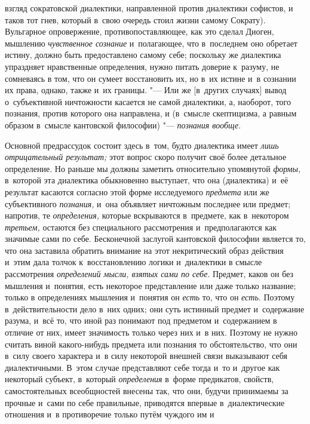 взгляд сократовской диалектики, направленной против диалектики софистов, и
таков тот гнев, который в~свою очередь стоил жизни самому Сократу).
Вульгарное опровержение, противопоставляющее, как это сделал Диоген,
мышлению {\em чувственное сознание}
и~полагающее, что в~последнем оно обретает истину, должно
быть предоставлено самому себе; поскольку же диалектика упраздняет
нравственные определения, нужно питать доверие к~разуму, не сомневаясь в
том, что он сумеет восстановить их, но в~их истине и~в сознании их права,
однако, также и~их границы. "--- Или же [в~других случаях]
вывод о~субъективной ничтожности касается не самой диалектики, а, наоборот,
того познания, против которого она направлена, и (в~смысле скептицизма, а
равным образом в~смысле кантовской философии) "--- {\em познания вообще}.

Основной предрассудок состоит здесь в~том, будто диалектика
имеет {\em лишь отрицательный
результат;} этот вопрос скоро получит своё более детальное
определение. Но раньше мы должны заметить относительно упомянутой
{\em формы,} в~которой
эта диалектика обыкновенно выступает, что она (диалектика) и~её результат
касаются согласно этой форме исследуемого {\em предмета} или же
субъективного {\em познания,} и~она объявляет ничтожным последнее или
предмет; напротив, те {\em определения,}
которые вскрываются в~предмете, как в~некотором {\em третьем,} остаются
без специального рассмотрения и~предполагаются как значимые сами по себе.
\label{bkm:bm126a}Бесконечной заслугой кантовской философии
является то, что она заставила обратить внимание на этот некритический
образ действия и~этим дала толчок к~восстановлению логики и~диалектики в
смысле рассмотрения {\em определений
мысли, взятых сами по себе}. Предмет, каков он без мышления
и~понятия, есть некоторое представление или даже только название; только в
определениях мышления и~понятия он {\em есть} то, что он {\em есть}. Поэтому
в~действительности дело в~них одних; они суть истинный предмет и~содержание
разума, и~всё то, что иной раз понимают под предметом и~содержанием в
отличие от них, имеет значимость только через них и~в них. Поэтому не нужно
считать виной какого-нибудь предмета или познания то обстоятельство, что
они в~силу своего характера и~в силу некоторой внешней связи выказывают
себя диалектичными. В~этом случае представляют себе тогда и~то и~другое как
некоторый субъект, в~который {\em определения} в~форме
предикатов, свойств, самостоятельных всеобщностей внесены так, что они,
будучи принимаемы за прочные и~сами по себе правильные, приводятся впервые
в~диалектические отношения и~в противоречие только путём чуждого им и
